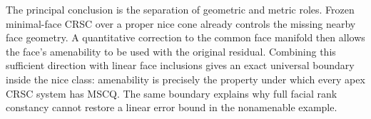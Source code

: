 \documentclass[11pt]{article}
\numberwithin{equation}{section}
\theoremstyle{definition}
\theoremstyle{remark}
\begin{document}
The principal conclusion is the separation of geometric and metric
roles. Frozen minimal-face CRSC over a proper nice cone already controls
the missing nearby face geometry. A quantitative correction to the
common face manifold then allows the face's amenability to be used with
the original residual. Combining this sufficient direction with linear
face inclusions gives an exact universal boundary inside the nice class:
amenability is precisely the property under which every apex CRSC system
has MSCQ. The same boundary explains why full facial rank constancy
cannot restore a linear error bound in the nonamenable example.



\end{document}
